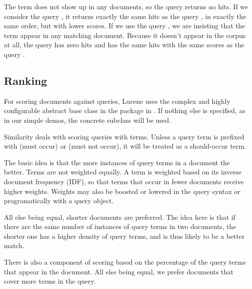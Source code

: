 The term  does not show up in any documents, so
the query  returns no hits.  If we consider the query
, it returns exactly the same hits as the query
, in exactly the same order, but with lower scores.  If we
use the query , we are insisting that the term
 appear in any matching document.  Because it
doesn't appear in the corpus at all, the query  has
zero hits and  has the same hits with the same
scores as the query .


\subsection{Ranking}

For scoring documents against queries, Lucene uses the complex and
highly configurable abstract base class  in the
package in .  If nothing else is
specified, as in our simple demos, the concrete subclass
 will be used.

Similarity deals with scoring queries with  terms.
Unless a query term is prefixed with \code{+} (must occur) or \code{-}
(must not occur), it will be treated as a should-occur term.

The basic idea is that the more instances of query terms in a document
the better.  Terms are not weighted equally.  A term is weighted based
on its inverse document frequency (IDF), so that terms that occur in
fewer documents receive higher weights.  Weights may also be boosted
or lowered in the query syntax or programatically with a query object.

All else being equal, shorter documents are preferred.  The idea here
is that if there are the same number of instances of query terms in two
documents, the shorter one has a higher density of query terms, and is
thus likely to be a better match.  

There is also a component of scoring based on the percentage of the
query terms that appear in the document.  All else being equal, we
prefer documents that cover more terms in the query.





 







